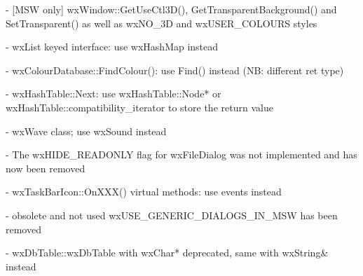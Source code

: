 - [MSW only] wxWindow::GetUseCtl3D(), GetTransparentBackground() and
             SetTransparent() as well as wxNO\_3D and wxUSER\_COLOURS styles

- wxList keyed interface: use wxHashMap instead

- wxColourDatabase::FindColour(): use Find() instead (NB: different ret type)

- wxHashTable::Next: use wxHashTable::Node* or
                     wxHashTable::compatibility\_iterator to store the return
                     value

- wxWave class; use wxSound instead

- The wxHIDE\_READONLY flag for wxFileDialog was not implemented
  and has now been removed

- wxTaskBarIcon::OnXXX() virtual methods: use events instead

- obsolete and not used wxUSE\_GENERIC\_DIALOGS\_IN\_MSW has been removed

- wxDbTable::wxDbTable with wxChar* deprecated, same with wxString& instead

